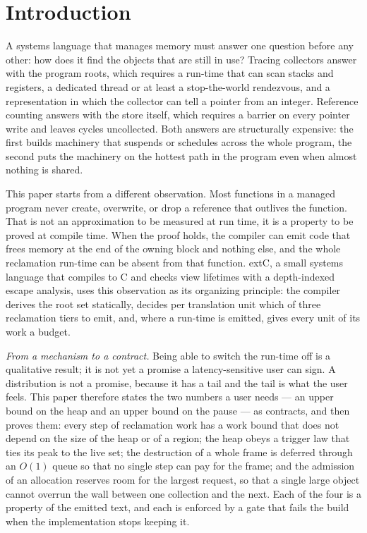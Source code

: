 \section{Introduction}
\label{sec:intro}

A systems language that manages memory must answer one question before any other:
how does it find the objects that are still in use?
Tracing collectors answer with the program roots, which requires a run-time that can scan stacks and registers,
a dedicated thread or at least a stop-the-world rendezvous, and a representation in which the collector can tell a pointer from an integer.
Reference counting answers with the store itself, which requires a barrier on every pointer write and leaves cycles uncollected.
Both answers are structurally expensive: the first builds machinery that suspends or schedules across the whole program,
the second puts the machinery on the hottest path in the program even when almost nothing is shared.

This paper starts from a different observation.
Most functions in a managed program never create, overwrite, or drop a reference that outlives the function.
That is not an approximation to be measured at run time, it is a property to be proved at compile time.
When the proof holds, the compiler can emit code that frees memory at the end of the owning block and nothing else,
and the whole reclamation run-time can be absent from that function.
extC, a small systems language that compiles to C and checks view lifetimes with a depth-indexed escape analysis,
uses this observation as its organizing principle: the compiler derives the root set statically, decides per translation unit
which of three reclamation tiers to emit, and, where a run-time is emitted, gives every unit of its work a budget.

\noindent\emph{From a mechanism to a contract.}
Being able to switch the run-time off is a qualitative result; it is not yet a promise a latency-sensitive user can sign.
A distribution is not a promise, because it has a tail and the tail is what the user feels.
This paper therefore states the two numbers a user needs --- an upper bound on the heap and an upper bound on the pause --- as contracts, and then proves them:
every step of reclamation work has a work bound that does not depend on the size of the heap or of a region;
the heap obeys a trigger law that ties its peak to the live set; the destruction of a whole frame is deferred through an
$O(1)$ queue so that no single step can pay for the frame; and the admission of an allocation reserves room for the largest
request, so that a single large object cannot overrun the wall between one collection and the next.
Each of the four is a property of the emitted text, and each is enforced by a gate that fails the build when the
implementation stops keeping it.

